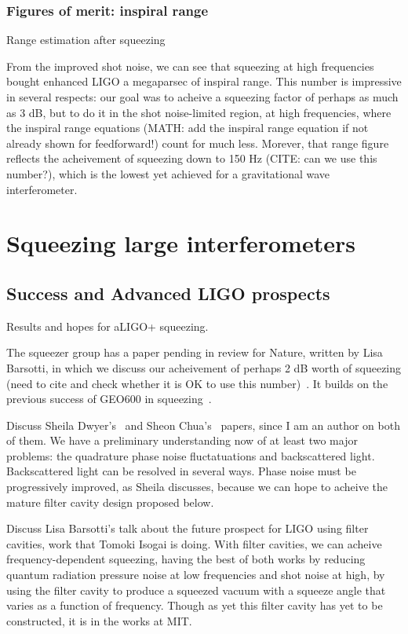             \subsubsection{Figures of merit: inspiral range}
            \label{range_est}

                Range estimation after squeezing

		From the improved shot noise, we can see that squeezing at high frequencies bought enhanced LIGO a megaparsec of inspiral range. This number is impressive in several respects: our goal was to acheive a squeezing factor of perhaps as much as 3 dB, but to do it in the shot noise-limited region, at high frequencies, where the inspiral range equations (MATH: add the inspiral range equation if not already shown for feedforward!) count for much less. Morever, that range figure reflects the acheivement of squeezing down to 150 Hz (CITE: can we use this number?), which is the lowest yet achieved for a gravitational wave interferometer.


\section{Squeezing large interferometers}

        \subsection{Success and Advanced LIGO prospects}
        \label{squeezing_success}
            Results and hopes for aLIGO+ squeezing.

	    The squeezer group has a paper pending in review for Nature, written by Lisa Barsotti, in which we discuss our acheivement of perhaps 2 dB worth of squeezing (need to cite and check whether it is OK to use this number)~\cite{BarsottiNatureSqueezing}. It builds on the previous success of GEO600 in squeezing~\cite{GEO600NatureSqueezing}.

	    Discuss Sheila Dwyer's~\cite{DwyerPhaseNoise} and Sheon Chua's~\cite{ChuaBackscatteredLight} papers, since I am an author on both of them. We have a preliminary understanding now of at least two major problems: the quadrature phase noise fluctatuations and backscattered light. Backscattered light can be resolved in several ways. Phase noise must be progressively improved, as Sheila discusses, because we can hope to acheive the mature filter cavity design proposed below.

Discuss Lisa Barsotti's talk about the future prospect for LIGO using filter cavities, work that Tomoki Isogai is doing. With filter cavities, we can acheive frequency-dependent squeezing, having the best of both works by reducing quantum radiation pressure noise at low frequencies and shot noise at high, by using the filter cavity to produce a squeezed vacuum with a squeeze angle that varies as a function of frequency. Though as yet this filter cavity has yet to be constructed, it is in the works at MIT.

